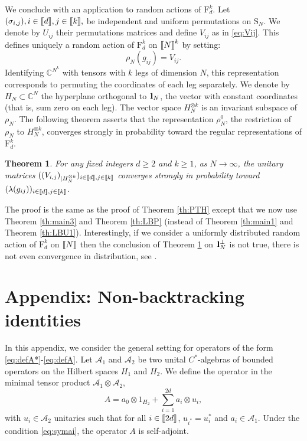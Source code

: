 \documentclass[11pt]{article}
\newtheorem{theorem}[lemma]{Theorem}
\newcommand{\cA}{\mathcal{A}}
\newcommand{\dF}{\mathrm{F}}
\newcommand{\dS}{\mathrm{S}}
\newcommand{\dC}{\mathbb {C}}
\newcommand{\1}{1\!\!{\sf I}}
\newcommand{\IND}{\1}
\newcommand{\INT}[1]{{{\left[\hspace{-1.4pt}\left[#1\right]\hspace{-1.4pt}\right]}}}
\begin{document}
We conclude with an application to random actions of $\dF_d^k$. Let $(\sigma_{i,j}), i \in \INT{d}, j \in \INT{k},$ be independent and uniform permutations on $\dS_N$. We denote by $U_{ij}$ their permutations matrices and define $V_{ij}$ as in \eqref{eq:Vij}. This defines uniquely a random action of $\dF_d^k$ on $\INT{N}^k$ by setting:
$$
\rho_N (g_{ij}) = V_{ij}.
$$
Identifying $\dC^{N^k}$ with tensors with $k$ legs of dimension $N$, this representation corresponds to permuting the coordinates of each leg separately. 
We denote by $H_N \subset \dC^N$ the hyperplane orthogonal to $\IND_N$, the vector with constant coordinates (that is, sum zero on each leg). The vector space $H_N^{\otimes k}$ is an invariant subspace of $\rho_N$. The following theorem asserts that the representation $\rho^0_N$, the restriction of $\rho_N$ to $H_N^{\otimes k}$, converges strongly in probability toward the regular representations of $\dF_d^k$. 

\begin{theorem}\label{th:randomactionFdk}
For any fixed integers $d \geq 2$ and $k \geq 1$, as $N\to \infty$, the unitary matrices $((V_{i,j})_{|H_N^{\otimes k}})_{i \in \INT{d}, j \in \INT{k}}$ converges strongly in probability toward $(\lambda(g_{ij}))_{i \in \INT{d}, j \in \INT{k}}$.
\end{theorem} 

The proof is the same as the proof of Theorem \ref{th:PTH} except that we now use Theorem \ref{th:main3} and Theorem \ref{th:LBP} (instead of Theorem \ref{th:main1} and Theorem \ref{th:LBU1}). Interestingly, if we consider a uniformly distributed random action of $\dF_d^k$ on $\INT{N}$ then the conclusion of Theorem \ref{th:randomactionFdk} on $\IND_N^\perp$ is not true, there is not even convergence in distribution, see \cite{313910}.


\section*{Appendix: Non-backtracking identities}
\label{sec:appendix-nonback}

In this appendix, we consider the general setting for operators of the form \eqref{eq:defA*}-\eqref{eq:defA}. Let $\cA_1$ and $\cA_2$ be two unital $C^*$-algebras of bounded operators on the Hilbert spaces $H_1$ and $H_2$. We define the operator in the minimal tensor product $\cA_1 \otimes \cA_2$,
\begin{equation}\label{eq:defAH}
A = a_0 \otimes 1_{H_2}  + \sum_{i=1}^{2d} a_i \otimes u_i,
\end{equation}
with $u_i \in \cA_2$ unitaries such that for all $i \in \INT{2d}$, $u_{i^*} = u_i^*$ and $a_i \in \cA_1$. Under the condition  \eqref{eq:symai}, the operator $A$ is self-adjoint.
\end{document}
